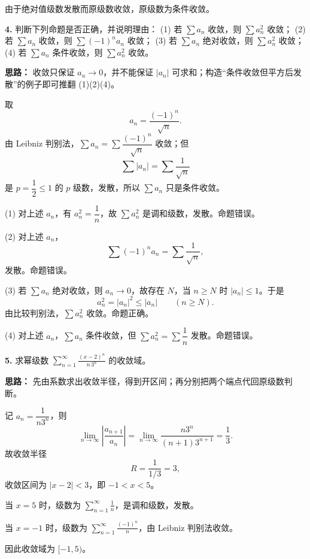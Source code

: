 由于绝对值级数发散而原级数收敛，原级数为条件收敛。

\else \answerarea[8] \fi%

\textbf{4.} 判断下列命题是否正确，并说明理由：
(1) 若 $\sum a_n$ 收敛，则 $\sum a_n^2$ 收敛；
(2) 若 $\sum a_n$ 收敛，则 $\sum(-1)^na_n$ 收敛；
(3) 若 $\sum a_n$ 绝对收敛，则 $\sum a_n^2$ 收敛；
(4) 若 $\sum a_n$ 条件收敛，则 $\sum a_n^2$ 收敛。

\ifshowsolutions%
\textbf{思路：} 收敛只保证 $a_n\to0$，并不能保证 $|a_n|$ 可求和；构造“条件收敛但平方后发散”的例子即可推翻 (1)(2)(4)。

取
\[
a_n=\frac{(-1)^n}{\sqrt n}.
\]
由 Leibniz 判别法，$\sum a_n=\sum\dfrac{(-1)^n}{\sqrt n}$ 收敛；但
\[
\sum|a_n|=\sum\frac{1}{\sqrt n}
\]
是 $p=\dfrac12\le1$ 的 $p$ 级数，发散，所以 $\sum a_n$ 只是条件收敛。

(1) 对上述 $a_n$，有 $a_n^2=\dfrac1n$，故 $\sum a_n^2$ 是调和级数，发散。命题错误。

(2) 对上述 $a_n$，
\[
\sum(-1)^na_n=\sum\frac{1}{\sqrt n},
\]
发散。命题错误。

(3) 若 $\sum a_n$ 绝对收敛，则 $a_n\to0$，故存在 $N$，当 $n\ge N$ 时 $|a_n|\le1$。于是
\[
a_n^2=|a_n|^2\le|a_n|\qquad(n\ge N).
\]
由比较判别法，$\sum a_n^2$ 收敛。命题正确。

(4) 对上述 $a_n$，$\sum a_n$ 条件收敛，但 $\sum a_n^2=\sum\dfrac1n$ 发散。命题错误。

\else \answerarea[8] \fi%

\textbf{5.} 求幂级数 $\displaystyle\sum_{n=1}^{\infty}\frac{(x-2)^n}{n\,3^n}$ 的收敛域。

\ifshowsolutions%
\textbf{思路：} 先由系数求出收敛半径，得到开区间；再分别把两个端点代回原级数判断。

记 $a_n=\dfrac{1}{n3^n}$，则
\[
\lim_{n\to\infty}\left|\frac{a_{n+1}}{a_n}\right|
=\lim_{n\to\infty}\frac{n3^n}{(n+1)3^{n+1}}
=\frac13.
\]
故收敛半径
\[
R=\frac{1}{1/3}=3,
\]
收敛区间为 $|x-2|<3$，即 $-1<x<5$。

当 $x=5$ 时，级数为 $\displaystyle\sum_{n=1}^{\infty}\frac{1}{n}$，是调和级数，发散。

当 $x=-1$ 时，级数为 $\displaystyle\sum_{n=1}^{\infty}\frac{(-1)^n}{n}$，由 Leibniz 判别法收敛。

因此收敛域为 $[-1,5)$。

\boxed{\parbox{0.9\linewidth}{\textbf{答案：}$[-1,5)$。}}
\else \answerarea[8] \fi%

